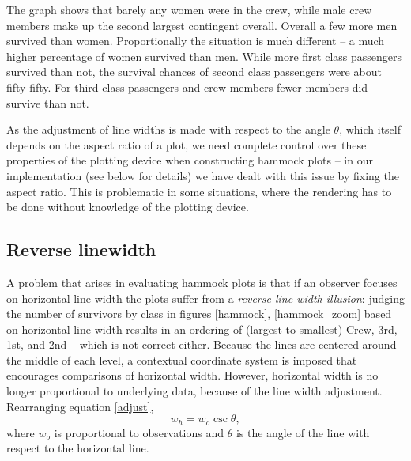 The graph shows that barely any women were in the crew, while male crew members make up the second largest contingent overall. Overall a few more men survived than women. Proportionally the situation is much different -- a much higher percentage of women survived than men. While more first class passengers survived than not, the  survival chances of second class passengers were about fifty-fifty. For third class passengers and crew members fewer members did  survive than not. 

As the adjustment of line widths is made with respect to the angle $\theta$, which itself depends on the aspect ratio of a plot, we need complete control over these properties of the plotting device when constructing hammock plots  -- in our implementation (see below for details) we have dealt with this issue by fixing the aspect ratio. This is problematic in some situations, where the rendering has to be done without knowledge of the plotting device. 

\subsection{Reverse linewidth}
A problem that arises in evaluating hammock plots is that if an observer focuses on horizontal line width  the plots suffer from a {\it reverse line width illusion}:  judging the number of survivors by class in figures \ref{hammock}, \ref{hammock_zoom} based on horizontal line width  results in an ordering of (largest to smallest) Crew, 3rd, 1st, and 2nd -- which is not correct either. %
Because the lines are centered around the middle of each level, a contextual coordinate system is imposed that encourages comparisons of horizontal width. However, horizontal width is no longer proportional to underlying data, because of the line width adjustment. Rearranging equation \ref{adjust}, 
\begin{equation}\label{rev}
w_h = w_o \csc \theta,
\end{equation}
 where $w_o$ is proportional to observations and $\theta$ is the angle of the line with respect to the horizontal line.

